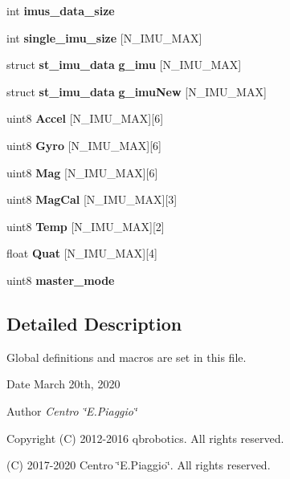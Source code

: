 \begin{DoxyCompactItemize}
\item 
\mbox{\label{globals_8h_a86272fcfcab512d38a11824196df4bbc}} 
int {\bfseries imus\+\_\+data\+\_\+size}
\item 
\mbox{\label{globals_8h_aca96c483c3e269e3805aa861ced0aef5}} 
int {\bfseries single\+\_\+imu\+\_\+size} [N\+\_\+\+I\+M\+U\+\_\+\+M\+AX]
\item 
\mbox{\label{globals_8h_ab72cce926a6439eda41315f45a9c379c}} 
struct \textbf{ st\+\_\+imu\+\_\+data} {\bfseries g\+\_\+imu} [N\+\_\+\+I\+M\+U\+\_\+\+M\+AX]
\item 
\mbox{\label{globals_8h_abb00fd907d732c0691940f718e231178}} 
struct \textbf{ st\+\_\+imu\+\_\+data} {\bfseries g\+\_\+imu\+New} [N\+\_\+\+I\+M\+U\+\_\+\+M\+AX]
\item 
\mbox{\label{globals_8h_a187c605f3898cf11e09f6f469c265920}} 
uint8 {\bfseries Accel} [N\+\_\+\+I\+M\+U\+\_\+\+M\+AX][6]
\item 
\mbox{\label{globals_8h_a49dba88a31d1b3b4190065b9ef1649fe}} 
uint8 {\bfseries Gyro} [N\+\_\+\+I\+M\+U\+\_\+\+M\+AX][6]
\item 
\mbox{\label{globals_8h_a5d88408ccb73729f049a52b4d1daaadf}} 
uint8 {\bfseries Mag} [N\+\_\+\+I\+M\+U\+\_\+\+M\+AX][6]
\item 
\mbox{\label{globals_8h_a1e598e1bdae5fe927fbd1f396161f3a6}} 
uint8 {\bfseries Mag\+Cal} [N\+\_\+\+I\+M\+U\+\_\+\+M\+AX][3]
\item 
\mbox{\label{globals_8h_af5f2d49e123a057d358297a34194ebdc}} 
uint8 {\bfseries Temp} [N\+\_\+\+I\+M\+U\+\_\+\+M\+AX][2]
\item 
\mbox{\label{globals_8h_a79179edea7394e7176f8768b1b0f6f92}} 
float {\bfseries Quat} [N\+\_\+\+I\+M\+U\+\_\+\+M\+AX][4]
\item 
uint8 \textbf{ master\+\_\+mode}
\end{DoxyCompactItemize}


\subsection{Detailed Description}
Global definitions and macros are set in this file. 

\begin{DoxyDate}{Date}
March 20th, 2020 
\end{DoxyDate}
\begin{DoxyAuthor}{Author}
{\itshape Centro \char`\"{}\+E.\+Piaggio\char`\"{}} 
\end{DoxyAuthor}
\begin{DoxyCopyright}{Copyright}
(C) 2012-\/2016 qbrobotics. All rights reserved. 

(C) 2017-\/2020 Centro \char`\"{}\+E.\+Piaggio\char`\"{}. All rights reserved. 
\end{DoxyCopyright}


